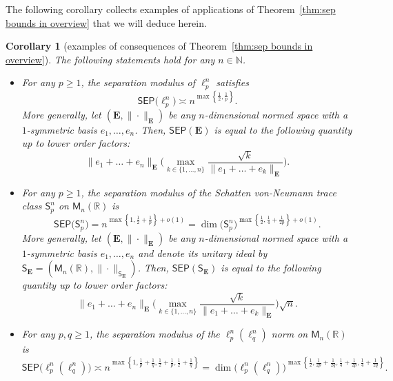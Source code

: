 \documentclass[11pt,reqno]{amsart}
\renewcommand{\ge}{\geqslant}
\newcommand{\n}{\{1,\ldots,n\}}
\newcommand{\R}{\mathbb R}
\newtheorem{corollary}[theorem]{Corollary}
\theoremstyle{remark}
\newcommand{\EE}{\mathbf{E}}
\newcommand{\M}{\mathsf{M}}
\newcommand{\sfS}{\mathsf{S}}
\newcommand{\N}{\mathbb N}
\renewcommand{\1}{\mathbf 1}
\newcommand{\sep}{\mathsf{SEP}}
\newcommand{\bfE}{\mathbf{E}}
\begin{document}
The following corollary collects examples of applications of Theorem~\ref{thm:sep bounds in overview}  that we will deduce herein.
\begin{corollary}[examples of consequences of Theorem~\ref{thm:sep bounds in overview}]\label{coro:examples of apps} The following statements  hold for any $n\in \N$.
\begin{itemize}
\item For any $p\ge 1$, the separation modulus of $\ell_p^n$ satisfies
\begin{equation}\label{eq:ellp case overview}
\sep\big(\ell_p^n\big)\asymp  n^{\max\left\{\frac12,\frac{1}{p}\right\}}.
\end{equation}
More generally,  let $(\mathbf{E},\|\cdot\|_{\mathbf{E}})$ be  any $n$-dimensional normed space with a $1$-symmetric basis $e_1,\ldots,e_n$. Then,   $\sep(\bfE)$ is equal to the following quantity up to lower order factors:
\begin{equation*}\label{eq:symmetric in overview}
\|e_1+\ldots +e_n\|_\EE\bigg(\max_{k\in \n}\frac{\sqrt{k}}{\|e_1+\ldots+e_k\|_\EE}\bigg).
\end{equation*}
\item For any $p\ge 1$, the separation modulus of the Schatten von-Neumann trace class $\sfS_p^n$ on $\M_n(\R)$ is
\begin{equation}\label{eq:Sp case overview}
\sep\big(\sfS_p^n\big)= n^{\max\left\{1,\frac12+\frac{1}{p}\right\}+o(1)}=\dim\big(\sfS_p^n\big)^{\max\left\{\frac12,\frac14+\frac{1}{2p}\right\}+o(1)}.
\end{equation}
More generally, let $(\mathbf{E},\|\cdot\|_{\mathbf{E}})$ be  any $n$-dimensional normed space with a $1$-symmetric basis $e_1,\ldots,e_n$ and denote its unitary ideal by $\sfS_{\mathbf{E}}=(\M_n(\R),\|\cdot\|_{\sfS_\mathbf{E}})$. Then, $\sep(\sfS_\bfE)$ is equal to the following quantity up to lower order factors:
\begin{equation*}\label{eq:ideal in overview}
 \|e_1+\ldots +e_n\|_\EE\bigg(\max_{k\in \n}\frac{\sqrt{k}}{\|e_1+\ldots+e_k\|_\EE}\bigg)\sqrt{n}.
\end{equation*}
\item For any $p,q\ge 1$, the separation modulus of the $\ell_p^n(\ell_q^n)$ norm on $\M_n(\R)$ is
\begin{equation}\label{eq:ellpellq case overview}
\sep\big(\ell_p^n(\ell_q^n)\big)\asymp n^{\max\left\{1,\frac{1}{p}+\frac{1}{q},\frac12+\frac{1}{p},\frac12+\frac{1}{q}\right\}}
=\dim\big(\ell_p^n(\ell_q^n)\big)^{\max\left\{\frac12,\frac{1}{2p}+\frac{1}{2q},\frac14+\frac{1}{2p},\frac14+\frac{1}{2q}\right\}}.

\end{equation}
\end{itemize}
\end{corollary}
\end{document}

